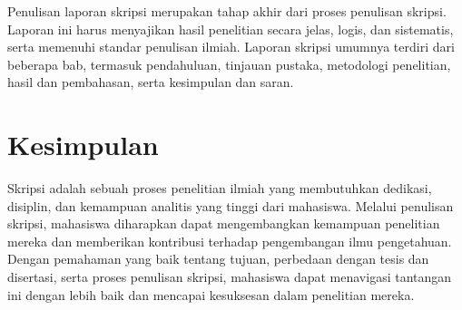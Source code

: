 \documentclass[
  indonesian,
  letterpaper,
  DIV=11,
  numbers=noendperiod]{scrreprt}
\begin{document}
Penulisan laporan skripsi merupakan tahap akhir dari proses penulisan
skripsi. Laporan ini harus menyajikan hasil penelitian secara jelas,
logis, dan sistematis, serta memenuhi standar penulisan ilmiah. Laporan
skripsi umumnya terdiri dari beberapa bab, termasuk pendahuluan,
tinjauan pustaka, metodologi penelitian, hasil dan pembahasan, serta
kesimpulan dan saran.

\section{Kesimpulan}\label{kesimpulan}

Skripsi adalah sebuah proses penelitian ilmiah yang membutuhkan
dedikasi, disiplin, dan kemampuan analitis yang tinggi dari mahasiswa.
Melalui penulisan skripsi, mahasiswa diharapkan dapat mengembangkan
kemampuan penelitian mereka dan memberikan kontribusi terhadap
pengembangan ilmu pengetahuan. Dengan pemahaman yang baik tentang
tujuan, perbedaan dengan tesis dan disertasi, serta proses penulisan
skripsi, mahasiswa dapat menavigasi tantangan ini dengan lebih baik dan
mencapai kesuksesan dalam penelitian mereka.
\end{document}
